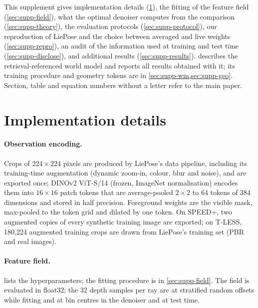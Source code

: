 \maketitlesupplementary
\setcounter{section}{0}
\renewcommand{\thesection}{\Alph{section}}

This supplement gives implementation details (\cref{sec:supp-impl}), the fitting of the feature field (\cref{sec:supp-field}), what
the optimal denoiser computes from the comparison (\cref{sec:supp-theory}), the
evaluation protocols (\cref{sec:supp-protocol}), our reproduction of LiePose and the choice between averaged and live weights
(\cref{sec:supp-repro}), an audit of the information used at training and test time (\cref{sec:supp-disclose}), and additional results
(\cref{sec:supp-results}).  describes the retrieval-referenced world model and reports all results obtained with
it; its training procedure and geometry tokens are in \cref{sec:supp-wm,sec:supp-geo}. Section, table and equation numbers without a
letter refer to the main paper.

\section{Implementation details}
\label{sec:supp-impl}

\paragraph{Observation encoding.}
Crops of $224\times224$ pixels are produced by LiePose's data pipeline, including its training-time augmentation (dynamic zoom-in, colour,
blur and noise), and are exported once; DINOv2 ViT-S/14 (frozen, ImageNet normalisation) encodes them into $16\times16$ patch tokens
that are average-pooled $2\times2$ to 64 tokens of 384 dimensions and stored in half precision. Foreground weights are the visible
mask, max-pooled to the token grid and dilated by one token. On SPEED+, two augmented copies of every synthetic training image are
exported; on T-LESS, 180,224 augmented training crops are drawn from LiePose's training set (PBR and real images).

\paragraph{Feature field.}
 lists the hyperparameters; the fitting procedure is in \cref{sec:supp-field}. The field is evaluated in float32;
the 32 depth samples per ray are at stratified random offsets while fitting and at bin centres in the denoiser and at test time.

